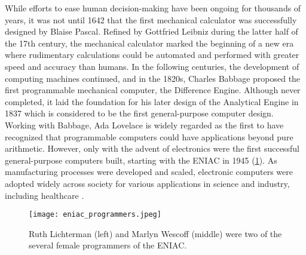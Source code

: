 While efforts to ease human decision-making have been ongoing for thousands of years, it was not until 1642 that the first mechanical calculator was successfully designed by Blaise Pascal. Refined by Gottfried Leibniz during the latter half of the 17th century, the mechanical calculator marked the beginning of a new era where rudimentary calculations could be automated and performed with greater speed and accuracy than humans. 
In the following centuries, the development of computing machines continued, and in the 1820s, Charles Babbage proposed the first programmable mechanical computer, the Difference Engine. Although never completed, it laid the foundation for his later design of the Analytical Engine in 1837 which is considered to be the first general-purpose computer design. 
Working with Babbage, Ada Lovelace is widely regarded as the first to have recognized that programmable computers could have applications beyond pure arithmetic. However, only with the advent of electronics were the first successful general-purpose computers built, starting with the ENIAC in 1945 (\cref{fig:eniac_programmers}).
As manufacturing processes were developed and scaled, electronic computers were adopted widely across society for various applications in science and industry, including healthcare \parencite{georges_universal_2001, harari_sapiens_2011}.

\begin{figure}
    \centering
    \texttt{[image: eniac\_programmers.jpeg]}
    \caption[Ruth Lichterman (left) and Marlyn Wescoff (middle) were two of the several female programmers of the ENIAC.]{ Ruth Lichterman (left) and Marlyn Wescoff (middle) were two of the several female programmers of the ENIAC. \parencite[photo credit][]{usarmyresearchlaboratoryarltechnicallibrary_female_1940}}
    \label{fig:eniac_programmers}
\end{figure}

